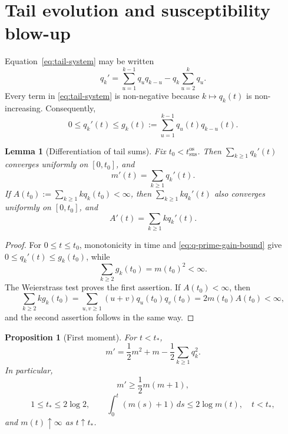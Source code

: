 \documentclass[11pt,a4paper]{amsart}
\newtheorem{proposition}[theorem]{Proposition}
\newtheorem{lemma}[theorem]{Lemma}
\theoremstyle{remark}
\begin{document}
\section{Tail evolution and susceptibility blow-up}
\label{sec:tail-evolution}

Equation~\eqref{eq:tail-system} may be written
\begin{equation}
\label{eq:tail-gain-loss}
        q_k'
        =
        \sum_{u=1}^{k-1}q_uq_{k-u}
        -q_k\sum_{u=2}^{k}q_u.
\end{equation}
Every term in \eqref{eq:tail-system} is non-negative because
\(k\mapsto q_k(t)\) is non-increasing. Consequently,
\begin{equation}
\label{eq:q-prime-gain-bound}
        0\leq q_k'(t)
        \leq
        g_k(t):=\sum_{u=1}^{k-1}q_u(t)q_{k-u}(t).
\end{equation}

\begin{lemma}[Differentiation of tail sums]
\label{lem:tail-differentiation}
Fix \(t_0<t_{\mathrm{sus}}^{\mathrm{os}}\). Then
\(\sum_{k\geq1}q_k'(t)\) converges uniformly on \([0,t_0]\), and
\[
        m'(t)=\sum_{k\geq1}q_k'(t).
\]
If \(A(t_0):=\sum_{k\geq1}kq_k(t_0)<\infty\), then
\(\sum_{k\geq1}kq_k'(t)\) also converges uniformly on \([0,t_0]\), and
\[
        A'(t)=\sum_{k\geq1}kq_k'(t).
\]
\end{lemma}

\begin{proof}
For \(0\leq t\leq t_0\), monotonicity in time and
\eqref{eq:q-prime-gain-bound} give
\(0\leq q_k'(t)\leq g_k(t_0)\), while
\[
        \sum_{k\geq2}g_k(t_0)=m(t_0)^2<\infty.
\]
The Weierstrass test proves the first assertion. If \(A(t_0)<\infty\),
then
\[
        \sum_{k\geq2}kg_k(t_0)
        =
        \sum_{u,v\geq1}(u+v)q_u(t_0)q_v(t_0)
        =
        2m(t_0)A(t_0)<\infty,
\]
and the second assertion follows in the same way.
\end{proof}

\begin{proposition}[First moment]
\label{prop:first-moment}
For \(t<t_*\),
\begin{equation}
\label{eq:mean-identity}
        m'
        =
        \frac12m^2+m-\frac12\sum_{k\geq1}q_k^2.
\end{equation}
In particular,
\begin{equation}
\label{eq:riccati-lower}
        m'\geq\frac12m(m+1),
\end{equation}
\[
        1\leq t_*\leq2\log2,
        \qquad
        \int_0^t(m(s)+1)\,ds\leq2\log m(t),\quad t<t_*,
\]
and \(m(t)\uparrow\infty\) as \(t\uparrow t_*\).
\end{proposition}
\end{document}
